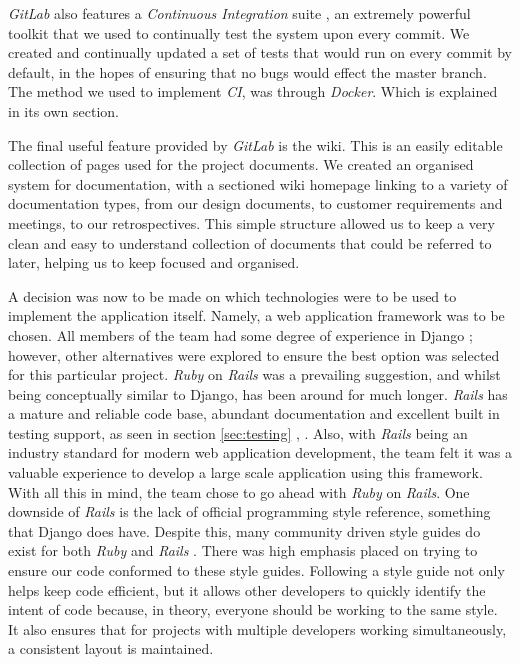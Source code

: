 \documentclass{l3proj}
\begin{document}
\textit{GitLab} also features a \textit{Continuous Integration} suite \cite{ci}, an extremely powerful toolkit that we used to continually test the system upon every commit. We created and continually updated a set of tests that would run on every commit by default, in the hopes of ensuring that no bugs would effect the master branch. The method we used to implement \textit{CI}, was through \textit{Docker}. Which is explained in its own section.

The final useful feature provided by \textit{GitLab} is the wiki. This is an easily editable collection of pages used for the project documents. We created an organised system for documentation, with a sectioned wiki homepage linking to a variety of documentation types, from our design documents, to customer requirements and meetings, to our retrospectives. This simple structure allowed us to keep a very clean and easy to understand collection of documents that could be referred to later, helping us to keep focused and organised.

A decision was now to be made on which technologies were to be used to implement the application itself. Namely, a web application framework was to be chosen. All members of the team had some degree of experience in Django \cite{django-overview}; however, other alternatives were explored to ensure the best option was selected for this particular project. \textit{Ruby} on \textit{Rails} was a prevailing suggestion, and whilst being conceptually similar to Django, has been around for much longer. \textit{Rails} has a mature and reliable code base, abundant documentation and excellent built in testing support, as seen in section \ref{sec:testing} \cite{rails-doctrine}, \cite{django-vs-rails}. Also, with \textit{Rails} being an industry standard for modern web application development, the team felt it was a valuable experience to develop a large scale application using this framework. With all this in mind, the team chose to go ahead with \textit{Ruby} on \textit{Rails}. One downside of \textit{Rails} is the lack of official programming style reference, something that Django does have. Despite this, many community driven style guides do exist for both \textit{Ruby} \cite{ruby-style-guide} and \textit{Rails} \cite{rails-style-guide}. There was high emphasis placed on trying to ensure our code conformed to these style guides. Following a style guide not only helps keep code efficient, but it allows other developers to quickly identify the intent of code because, in theory, everyone should be working to the same style. It also ensures that for projects with multiple developers working simultaneously, a consistent layout is maintained.
\end{document}
